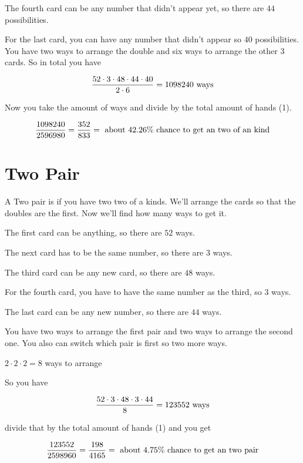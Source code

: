 \documentclass[12pt]{article}
\begin{document}
The fourth card can be any number that didn't appear yet, so there are $44$ possibilities.

For the last card, you can have any number that didn't appear so $40$ possibilities.
You have two ways to arrange the double and six ways to arrange the other 3 cards.
So in total you have

\begin{equation}
{52 \cdot 3 \cdot 48 \cdot 44 \cdot 40 \over 2 \cdot 6} = 1098240  \hbox{ ways}
\end{equation}


Now you take the amount of ways and divide by the total amount of hands (1).

\begin{equation}
{1098240 \over 2596980} = {352 \over 833} = \hbox{ about } 42.26\% \hbox{ chance to get an two of an kind}
\end{equation}

\section{Two Pair}

A Two pair is if you have two two of a kinds.
We'll arrange the cards so that the doubles are the first.
Now we'll find how many ways to get it.

The first card can be anything, so there are $52$ ways.

The next card has to be the same number, so there are $3$ ways.

The third card can be any new card, so there are $48$ ways.

For the fourth card, you have to have the same number as the third, so $3$ ways.

The last card can be any new number, so there are $44$ ways.

You have two ways to arrange the first pair and two ways to arrange the second one. You also can switch which pair is first so two more ways.

$ 2 \cdot 2 \cdot 2 = 8$ ways to arrange

So you have

\begin{equation}
{52 \cdot 3 \cdot 48 \cdot 3 \cdot 44 \over 8} = 123552 \hbox{ ways}
\end{equation}

divide that by the total amount of hands (1) and you get

\begin{equation}
{123552 \over 2598960} = {198 \over 4165} = \hbox{ about } 4.75\% \hbox{ chance to get an two pair}
\end{equation}
\end{document}
